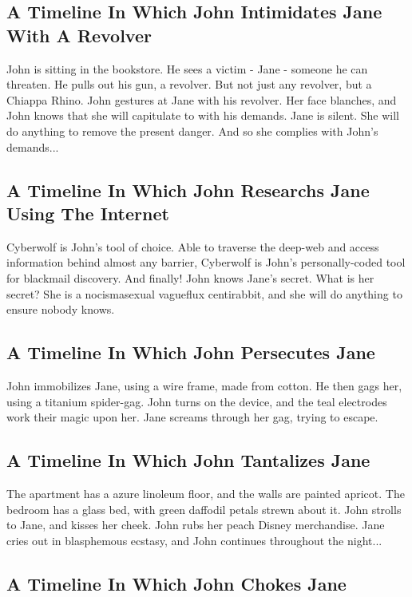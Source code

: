 \documentclass{article}
\begin{document}
\subsection{A Timeline In Which John Intimidates Jane With A Revolver}


John is sitting in the bookstore.
He sees a victim {-} Jane {-} someone he can threaten. He pulls out his gun, a revolver.
But not just any revolver, but a Chiappa Rhino.
John gestures at Jane with his revolver. Her face blanches, and John knows that she will capitulate to with his demands.
Jane is silent. She will do anything to remove the present danger. And so she complies with John's demands...
\subsection{A Timeline In Which John Researchs Jane Using The Internet}


Cyberwolf is John's tool of choice. Able to traverse the deep{-}web and access information behind almost any barrier, Cyberwolf is John's personally{-}coded tool for blackmail discovery.
And finally!
John knows Jane's secret. What is her secret? She is a nocismasexual vagueflux centirabbit, and she will do anything to ensure nobody knows.
\subsection{A Timeline In Which John Persecutes Jane}


John immobilizes Jane, using a wire frame, made from cotton.
He then gags her, using a titanium spider{-}gag.
John turns on the device, and the teal electrodes work their magic upon her.
Jane screams through her gag, trying to escape.
\subsection{A Timeline In Which John Tantalizes Jane}


The apartment has a azure linoleum floor, and the walls are painted apricot.
The bedroom has a glass bed, with green daffodil petals strewn about it.
John strolls to Jane, and kisses her cheek.
John rubs her peach Disney merchandise.
Jane cries out in blasphemous ecstasy, and John continues throughout the night...
\subsection{A Timeline In Which John Chokes Jane}
\end{document}
